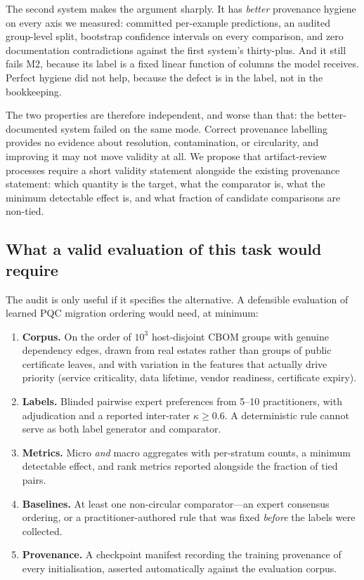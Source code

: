 \documentclass[conference]{IEEEtran}
\begin{document}
The second system makes the argument sharply. It has \emph{better} provenance hygiene on
every axis we measured: committed per-example predictions, an audited group-level split,
bootstrap confidence intervals on every comparison, and zero documentation contradictions
against the first system's thirty-plus. And it still fails M2, because its label is a fixed
linear function of columns the model receives. Perfect hygiene did not help, because the
defect is in the label, not in the bookkeeping.

The two properties are therefore independent, and worse than that: the better-documented
system failed on the same mode. Correct provenance labelling provides no evidence about
resolution, contamination, or circularity, and improving it may not move validity at all. We propose that artifact-review processes
require a short validity statement alongside the existing provenance statement: which
quantity is the target, what the comparator is, what the minimum detectable effect is,
and what fraction of candidate comparisons are non-tied.

\subsection{What a valid evaluation of this task would require}

The audit is only useful if it specifies the alternative. A defensible evaluation of learned
PQC migration ordering would need, at minimum:

\begin{enumerate}
\itemsep1pt
\item \textbf{Corpus.} On the order of $10^3$ host-disjoint CBOM groups with genuine
dependency edges, drawn from real estates rather than groups of public certificate leaves,
and with variation in the features that actually drive priority (service criticality,
data lifetime, vendor readiness, certificate expiry).
\item \textbf{Labels.} Blinded pairwise expert preferences from 5--10 practitioners, with
adjudication and a reported inter-rater $\kappa \geq 0.6$. A deterministic rule cannot
serve as both label generator and comparator.
\item \textbf{Metrics.} Micro \emph{and} macro aggregates with per-stratum counts, a
minimum detectable effect, and rank metrics reported alongside the fraction of tied pairs.
\item \textbf{Baselines.} At least one non-circular comparator---an expert consensus
ordering, or a practitioner-authored rule that was fixed \emph{before} the labels were
collected.
\item \textbf{Provenance.} A checkpoint manifest recording the training provenance of every
initialisation, asserted automatically against the evaluation corpus.
\end{enumerate}
\end{document}
